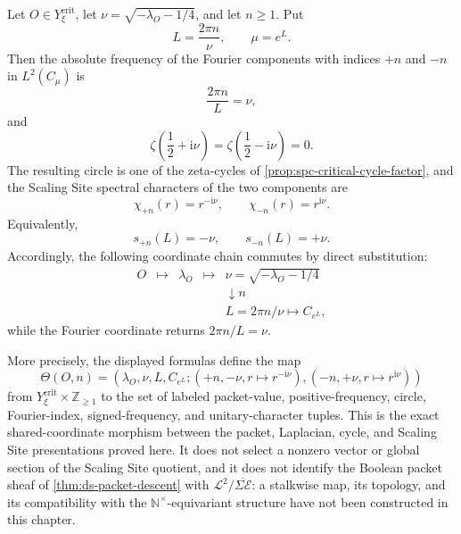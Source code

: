 \begin{theorem}
\label{thm:spc-scaling-site-interface}
Let \(O\in Y_\xi^{\mathrm{crit}}\), let
\(\nu=\sqrt{-\lambda_O-1/4}\), and let \(n\geq1\).  Put
\begin{equation}
\label{eq:spc-L-mu-frequency}
 L=\frac{2\pi n}{\nu},
 \qquad
 \mu=e^L.
\end{equation}
Then the absolute frequency of the Fourier components with indices
\(+n\) and \(-n\) in \(L^2(C_\mu)\) is
\begin{equation}
\label{eq:spc-Fourier-frequency-equality}
 \frac{2\pi n}{L}=\nu,
\end{equation}
and
\begin{equation}
\label{eq:spc-scaling-zeta-vanishing}
 \zeta\left(\frac12+\mathrm i\nu\right)
 =
 \zeta\left(\frac12-\mathrm i\nu\right)
 =0.
\end{equation}
The resulting circle is one of the zeta-cycles of
\cref{prop:spc-critical-cycle-factor}, and the Scaling Site spectral
characters of the two components are
\begin{equation}
\label{eq:spc-scaling-character}
 \chi_{+n}(r)=r^{-\mathrm i\nu},
 \qquad
 \chi_{-n}(r)=r^{\mathrm i\nu}.
\end{equation}
Equivalently,
\begin{equation}
\label{eq:spc-signed-index-frequency-pair}
 s_{+n}(L)=-\nu,
 \qquad
 s_{-n}(L)=+\nu.
\end{equation}
Accordingly, the following coordinate chain commutes by direct substitution:
\[
 \begin{array}{ccccc}
 O&\longmapsto&\lambda_O&\longmapsto&
 \nu=\sqrt{-\lambda_O-1/4}\\[2mm]
 &&&&\downarrow\scriptstyle n\\[-1mm]
 &&&&L=2\pi n/\nu\longmapsto C_{e^L},
 \end{array}
\]
while the Fourier coordinate returns \(2\pi n/L=\nu\).

More precisely, the displayed formulas define the map
\begin{equation}
\label{eq:spc-labeled-scaling-interface-map}
 \Theta(O,n)
 =
 \left(
   \lambda_O,\nu,L,C_{e^L};
   (+n,-\nu,r\mapsto r^{-\mathrm i\nu}),
   (-n,+\nu,r\mapsto r^{\mathrm i\nu})
 \right)
\end{equation}
from \(Y_\xi^{\mathrm{crit}}\times\mathbb Z_{\geq1}\) to the set of labeled
packet-value, positive-frequency, circle, Fourier-index, signed-frequency, and
unitary-character tuples.  This is the exact shared-coordinate morphism between
the packet, Laplacian, cycle, and Scaling Site presentations proved here.  It
does not select a nonzero vector or global section of the Scaling Site quotient,
and it does not identify the Boolean packet sheaf of
\cref{thm:ds-packet-descent} with
\(\mathcal L^2/\overline{\Sigma\mathcal E}\): a stalkwise map, its topology,
and its compatibility with the \(\mathbb N^\times\)-equivariant structure
have not been constructed in this chapter.
\end{theorem}

